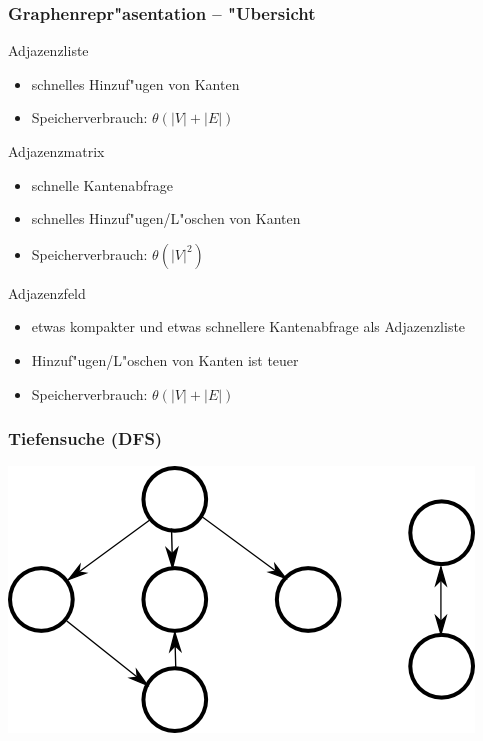 \documentclass{beamer}
\begin{document}
\begin{frame}
\frametitle{Graphenrepr"asentation -- "Ubersicht}
\begin{block}{Adjazenzliste}
\begin{itemize}
\item schnelles Hinzuf"ugen von Kanten
\item Speicherverbrauch: $\theta(|V| + |E|)$
\end{itemize}
\end{block}

\begin{block}{Adjazenzmatrix}
\begin{itemize}
\item schnelle Kantenabfrage
\item schnelles Hinzuf"ugen/L"oschen von Kanten
\item Speicherverbrauch: $\theta(|V|^2)$
\end{itemize}
\end{block}

\begin{block}{Adjazenzfeld}
\begin{itemize}
\item etwas kompakter und etwas schnellere Kantenabfrage als Adjazenzliste
\item Hinzuf"ugen/L"oschen von Kanten ist teuer
\item Speicherverbrauch: $\theta(|V| + |E|)$
\end{itemize}
\end{block}
\end{frame}


\begin{frame}
\frametitle{Tiefensuche (DFS)}
\begin{center}
\includegraphics{search_start}
\end{center}
\end{frame}
\end{document}

